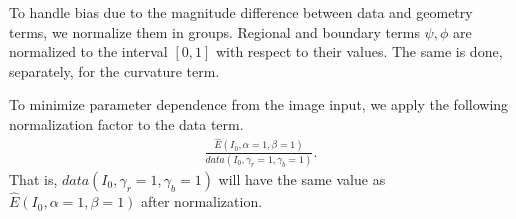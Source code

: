 \documentclass{siamart220329}
\begin{document}
%
%
To handle bias due to the magnitude difference between data and geometry terms,
we normalize them in groups. Regional and boundary terms $\psi,\phi$ are
normalized to the interval $[0,1]$ with respect to their values. The same is
done, separately, for the curvature term.

To minimize parameter dependence from the image input, we apply the following 
normalization factor to the data term.
%
%
\begin{align*}
    \frac{\hat{E}(I_0,\alpha=1,\beta=1)}{data(I_0,\gamma_r=1, \gamma_b=1)}.
\end{align*}
%
%
That is, $data(I_0,\gamma_r=1, \gamma_b=1)$ will have the same value as 
$\hat{E}(I_0, \alpha=1, \beta=1)$ after normalization.

%
%
\end{document}
